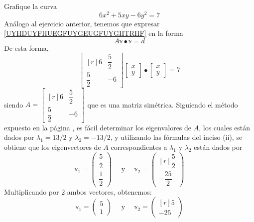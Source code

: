 \begin{example}
    Grafique la curva
    \begin{equation}
        6x^2 + 5xy - 6y^2 = 7 \label{UYHDUYFHUEGFUYGEUGFUYGHTRHF}
    \end{equation}
    \solucion Análogo al ejercicio anterior, tenemos que expresar \eqref{UYHDUYFHUEGFUYGEUGFUYGHTRHF} en la forma
    \begin{equation}
        A\mathbb{v} \bullet \mathbb{v} = d \label{JHEFRFRGUJHRHGUHRUR}
    \end{equation}
    De esta forma,
    $$\begin{bmatrix*}[r]
        6 & \dfrac{5}{2} \\[2mm]
        \dfrac{5}{2} & - 6
    \end{bmatrix*} \begin{bmatrix}
        x \\
        y
    \end{bmatrix} \bullet \begin{bmatrix}
        x \\
        y
    \end{bmatrix} = 7$$
    siendo $A = \begin{bmatrix*}[r]
        6 & \dfrac{5}{2} \\[2mm]
        \dfrac{5}{2} & - 6
    \end{bmatrix*}$ que es una matriz simétrica. Siguiendo el método expuesto en la página \pageref{metodo_eigen_2x2}, es fácil determinar los eigenvalores de $A$, los cuales están dados por $\lambda_1 = 13/2$ y $\lambda_2 = -13/2$, y utilizando las fórmulas del inciso (ii), se obtiene que los eigenvectores de $A$ correspondientes a $\lambda_1$ y $\lambda_2$ están dados por
    $$\mathbb{v}_1 = \begin{pmatrix} \dfrac{5}{2} \\[3mm] \dfrac{1}{2} \end{pmatrix} \quad \text{ y } \quad \mathbb{v}_2 = \begin{pmatrix*}[r] \dfrac{5}{2} \\[3mm] - \dfrac{25}{2} \end{pmatrix*}$$
    Multiplicando por $2$ ambos vectores, obtenemos:
    $$\mathbb{v}_1 = \begin{pmatrix} 5 \\ 1 \end{pmatrix} \quad \text{ y } \quad \mathbb{v}_2 = \begin{pmatrix*}[r] 5 \\ - 25 \end{pmatrix*}$$

\end{example}
